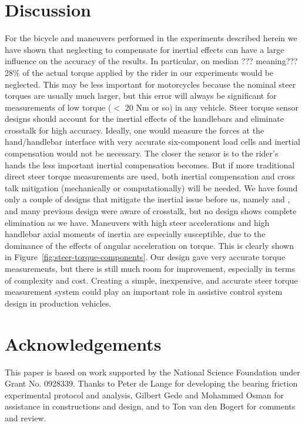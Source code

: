 \documentclass[10pt]{article}
\begin{document}
\section*{Discussion}

For the bicycle and maneuvers performed in the experiments described herein we have shown
that neglecting to compensate for inertial effects can have a large influence
on the accuracy of the results. In particular, on median ??? meaning??? 28\% of the actual
torque applied by the rider in our experiments would be neglected. This may be
less important for motorcycles because the nominal steer torques are usually
much larger, but this error will always be significant for measurements of low
torque ($<$ 20 Nm or so) in any vehicle. Steer torque sensor designs should
account for the inertial effects of the handlebars and eliminate crosstalk for
high accuracy. Ideally, one would measure the forces at the hand/handlebar
interface with very accurate six-component load cells and inertial compensation
would not be necessary. The closer the sensor is to the rider's hands the less
important inertial compensation becomes. But if more traditional direct steer
torque measurements are used, both inertial compensation and cross talk
mitigation (mechanically or computationally) will be needed. We have found only
a couple of designs that mitigate the inertial issue before us, namely
\cite{Evertse2010} and \cite{Iuchi2006}, and many previous design were aware of
crosstalk, but no design shows complete elimination as we have. Maneuvers with
high steer accelerations and high handlebar axial moments of inertia are
especially susceptible, due to the dominance of the effects of angular
acceleration on torque. This is clearly shown in
Figure~\ref{fig:steer-torque-components}. Our design gave very accurate torque
measurements, but there is still much room for improvement, especially in terms
of complexity and cost. Creating a simple, inexpensive, and accurate steer
torque measurement system could play an important role in assistive control
system design in production vehicles.

\section*{Acknowledgements}

This paper is based on work supported by the National Science Foundation under
Grant No. 0928339. Thanks to Peter de Lange for developing the bearing friction
experimental protocol and analysis, Gilbert Gede and Mohammed Osman for
assistance in constructions and design, and to Ton van den Bogert for comments
and review.



\end{document}
